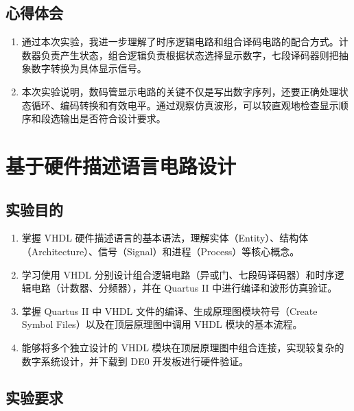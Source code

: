 \documentclass{ctexrep}
\begin{document}
\section{心得体会}

\begin{enumerate}
    \item 通过本次实验，我进一步理解了时序逻辑电路和组合译码电路的配合方式。计数器负责产生状态，组合逻辑负责根据状态选择显示数字，七段译码器则把抽象数字转换为具体显示信号。
    \item 本次实验说明，数码管显示电路的关键不仅是写出数字序列，还要正确处理状态循环、编码转换和有效电平。通过观察仿真波形，可以较直观地检查显示顺序和段选输出是否符合设计要求。
\end{enumerate}

\graphicspath{{../4. fpga/figures/}}
\chapter{基于硬件描述语言电路设计}

\section{实验目的}

\begin{enumerate}
    \item 掌握 VHDL 硬件描述语言的基本语法，理解实体（Entity）、结构体（Architecture）、信号（Signal）和进程（Process）等核心概念。
    \item 学习使用 VHDL 分别设计组合逻辑电路（异或门、七段码译码器）和时序逻辑电路（计数器、分频器），并在 Quartus II 中进行编译和波形仿真验证。
    \item 掌握 Quartus II 中 VHDL 文件的编译、生成原理图模块符号（Create Symbol Files）以及在顶层原理图中调用 VHDL 模块的基本流程。
    \item 能够将多个独立设计的 VHDL 模块在顶层原理图中组合连接，实现较复杂的数字系统设计，并下载到 DE0 开发板进行硬件验证。
\end{enumerate}

\section{实验要求}
\end{document}
